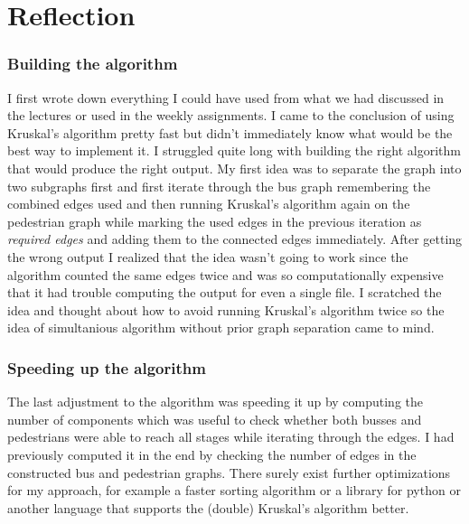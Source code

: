 \documentclass[a4paper]{article}
\begin{document}
\section{Reflection}

\subsubsection*{Building the algorithm}
I first wrote down everything I could have used from what we had discussed in the lectures or used in the weekly assignments. I came to the conclusion of using Kruskal's algorithm pretty fast but didn't immediately know what would be the best way to implement it. I struggled quite long with building the right algorithm that would produce the right output. My first idea was to separate the graph into two subgraphs first and first iterate through the bus graph remembering the combined edges used and then running Kruskal's algorithm again on the pedestrian graph while marking the used edges in the previous iteration as \textsl{required edges} and adding them to the connected edges immediately. After getting the wrong output I realized that the idea wasn't going to work since the algorithm counted the same edges twice and was so computationally expensive that it had trouble computing the output for even a single file. I scratched the idea and thought about how to avoid running Kruskal's algorithm twice so the idea of simultanious algorithm without prior graph separation came to mind.

\subsubsection*{Speeding up the algorithm}
The last adjustment to the algorithm was speeding it up by computing the number of components which was useful to check whether both busses and pedestrians were able to reach all stages while iterating through the edges. I had previously computed it in the end by checking the number of edges in the constructed bus and pedestrian graphs. There surely exist further optimizations for my approach, for example a faster sorting algorithm or a library for python or another language that supports the (double) Kruskal's algorithm better.
\end{document}
